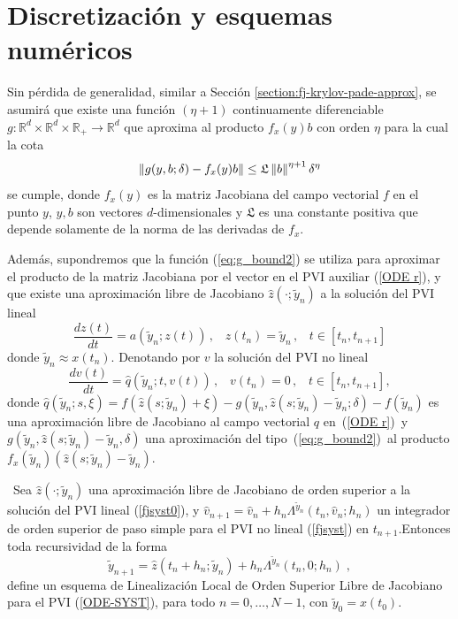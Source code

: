 \section{Discretización y esquemas numéricos}

Sin pérdida de generalidad, similar a Sección \ref{section:fj-krylov-pade-approx}, se asumirá que existe una función $(\eta+1)$ continuamente diferenciable $g: \mathbb{R}^{d}\times \mathbb{R}^{d} \times \mathbb{R}_+ \to \mathbb{R}^{d}$ que aproxima al producto $f_x(y)b$ con orden $\eta$ para la cual la cota
\begin{equation} \label{eq:g_bound2}
	\left\lVert g(y,b;\delta)-f_x(y)b \right\rVert \leq \mathfrak{L}\left\lVert b \right\rVert^{\eta+1}\delta^{\eta}
\end{equation}
se cumple, donde $f_x(y)$ es la matriz Jacobiana del campo vectorial $f$ en el punto $y$, $y,b$ son vectores $d$-dimensionales y $\mathfrak{L}$ es una constante positiva que depende solamente de la norma de las derivadas de $f_x$.

Además, supondremos que la función (\ref{eq:g_bound2}) se utiliza para aproximar el producto de la matriz Jacobiana por el vector en el PVI auxiliar (\ref{ODE r}), y que existe una aproximación libre de Jacobiano $\widehat{z}(\cdotp ;\widetilde{y}_n)$ a la solución del PVI lineal
\begin{equation}
    \frac{dz(t)}{dt} = a(\widetilde{y}_n;z(t)) \,,\;\;\; z(t_n)=\widetilde{y}_n \,,\;\;\; t\in[t_n,t_{n+1}]\label{fjsyst0}
\end{equation}
donde $\widetilde{y}_n\approx x(t_n)$. Denotando por $v$ la solución del PVI no lineal
\begin{equation}
    \frac{dv(t)}{dt} = \widehat{q}(\widetilde{y}_n;t,v(t)) \,,\;\;\; v(t_n)=0 \,,\;\;\; t\in[t_n,t_{n+1}], \label{fjsyst}
\end{equation}
donde $\widehat{q}(\widetilde{y}_n;s,\xi)=f(\widehat{z}(s;\widetilde{y}_n)+\xi)-g(\widetilde{y}_n,\widehat{z}(s;\widetilde{y}_n)-\widetilde{y}_n;\delta)-f(\widetilde{y}_n)$ es una aproximación libre de Jacobiano al campo vectorial $q$ en~(\ref{ODE r})~y $g(\widetilde{y}_n,\widehat{z}(s;\widetilde{y}_n)-\widetilde{y}_n,\delta)$ una aproximación del tipo~(\ref{eq:g_bound2})~al producto $f_x(\widetilde{y}_n)(\widehat{z}(s;\widetilde{y}_n)-\widetilde{y}_n)$.

\begin{definition}\label{definition:holl-fj}
\cite{naranjo2023jacobian}~Sea $\hat{z}(\cdot;\widetilde{y}_n)$ una aproximación libre de Jacobiano de orden superior a la solución del PVI lineal (\ref{fjsyst0}), y $\widehat{v}_ {n+1}=\widehat{v}_n+h_n\Lambda^{\widetilde{y}_n}(t_n,\widehat{v}_n;h_n)$ un integrador de orden superior de paso simple para el PVI no lineal (\ref{fjsyst}) en $t_{n+1}$.Entonces toda recursividad de la forma
\begin{equation*}
    \widetilde{y}_{n+1}= \hat{z}(t_n+h_n;\widetilde{y}_n)+h_n\Lambda^{\widetilde{y}_n}(t_n,0;h_n)\;,
\end{equation*}
define un esquema de Linealización Local de Orden Superior Libre de Jacobiano para el PVI (\ref{ODE-SYST}), para todo $n=0,\ldots,N-1$, con $\widetilde{y}_0=x(t_0)$.
\end{definition}

